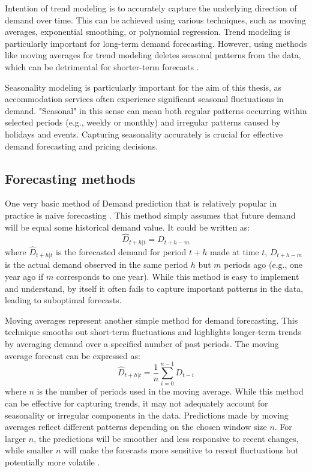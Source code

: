 Intention of trend modeling is to accurately capture the underlying direction of demand over time. This can be achieved using various techniques, such as moving averages, exponential smoothing, or polynomial regression. Trend modeling is particularly important for long-term demand forecasting. However, using methods like moving averages for trend modeling deletes seasonal patterns from the data, which can be detrimental for shorter-term forecasts \cite{Petricek2021}.

Seasonality modeling is particularly important for the aim of this thesis, as accommodation services often experience significant seasonal fluctuations in demand. "Seasonal" in this sense can mean both regular patterns occurring within selected periods (e.g., weekly or monthly) and irregular patterns caused by holidays and events. Capturing seasonality accurately is crucial for effective demand forecasting and pricing decisions.

\subsection{Forecasting methods}
One very basic method of Demand prediction that is relatively popular in practice is naive forecasting \cite{Petricek2021}. This method simply assumes that future demand will be equal some historical demand value. It could be written as:
\begin{equation}
    \hat{D}_{t+h|t} = D_{t+h-m}
\end{equation}
where $\hat{D}_{t+h|t}$ is the forecasted demand for period $t+h$ made at time $t$, $D_{t+h-m}$ is the actual demand observed in the same period $h$ but $m$ periods ago (e.g., one year ago if $m$ corresponds to one year). While this method is easy to implement and understand, by itself it often fails to capture important patterns in the data, leading to suboptimal forecasts.

Moving averages represent another simple method for demand forecasting. This technique smooths out short-term fluctuations and highlights longer-term trends by averaging demand over a specified number of past periods. The moving average forecast can be expressed as:
\begin{equation}
    \hat{D}_{t+h|t} = \frac{1}{n} \sum_{i=0}^{n-1} D_{t-i}
\end{equation}
where $n$ is the number of periods used in the moving average. While this method can be effective for capturing trends, it may not adequately account for seasonality or irregular components in the data. Predictions made by moving averages reflect different patterns depending on the chosen window size $n$. For larger $n$, the predictions will be smoother and less responsive to recent changes, while smaller $n$ will make the forecasts more sensitive to recent fluctuations but potentially more volatile \cite{Petricek2021}.

